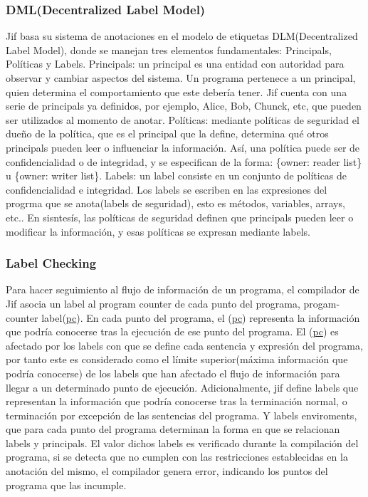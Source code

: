 \subsubsection{DML(Decentralized Label Model)}
Jif basa su sistema de anotaciones en el modelo de etiquetas DLM(Decentralized
Label Model), donde se manejan tres elementos fundamentales: Principals,
Políticas y Labels.\newline
Principals: un principal es una entidad con autoridad para observar y cambiar
aspectos del sistema. Un programa pertenece a un principal, quien determina el
comportamiento que este debería tener. Jif cuenta con una serie de principals ya
definidos, por ejemplo, Alice, Bob, Chunck, etc, que pueden ser
utilizados al momento de anotar.\newline 
Políticas: mediante políticas de seguridad el dueño de la política, que es el
principal que la define, determina qué otros principals pueden leer o
influenciar la información. Así, una política puede ser de confidencialidad o de
integridad, y se especifican de la forma: \{owner: reader list\} u
\{owner: writer list\}.\newline 
Labels: un label consiste en un conjunto de políticas de confidencialidad e
integridad. Los labels se escriben en las expresiones del progrma que se
anota(labels de seguridad), esto es métodos, variables, arrays, etc..\newline 
En sisntesís, las políticas de seguridad definen que principals pueden leer o
modificar la información, y esas políticas se expresan mediante labels.

\subsubsection{Label Checking}
Para hacer seguimiento al flujo de información de un programa, el compilador de
Jif asocia un label al program counter de cada punto del programa,
progam-counter label(\underline{pc}). En cada punto del programa, el
(\underline{pc}) representa la información que podría conocerse tras la
ejecución de ese punto del programa.
El (\underline{pc}) es afectado por los labels con que se define cada sentencia
y expresión del programa, por tanto este es considerado como el límite
superior(máxima información que podría conocerse) de los labels que han afectado
el flujo de información para llegar a un determinado punto de ejecución.\newline
Adicionalmente, jif define labels que representan la información que podría
conocerse tras la terminación normal, o terminación por excepción de las
sentencias del programa. Y labels enviroments, que para cada punto del programa
determinan la forma en que se relacionan labels y principals.\newline
El valor dichos labels es verificado durante la compilación del programa, si se
detecta que no cumplen con las restricciones establecidas en la anotación del
mismo, el compilador genera error, indicando los puntos del programa que las
incumple.\newline

